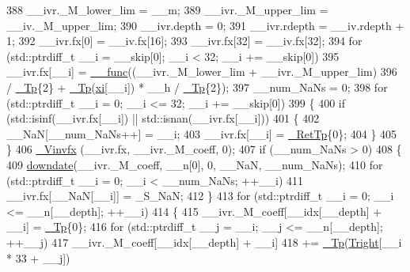 \begin{DoxyCode}
388               \_\_ivr.\_M\_lower\_lim = \_\_m;
389               \_\_ivr.\_M\_upper\_lim = \_\_iv.\_M\_upper\_lim;
390               \_\_ivr.depth = 0;
391               \_\_ivr.rdepth = \_\_iv.rdepth + 1;
392               \_\_ivr.fx[0] = \_\_iv.fx[16];
393               \_\_ivr.fx[32] = \_\_iv.fx[32];
394               \textcolor{keywordflow}{for} (std::ptrdiff\_t \_\_i = \_\_skip[0]; \_\_i < 32; \_\_i += \_\_skip[0])
395                 \_\_ivr.fx[\_\_i] = \hyperlink{namespace____gnu__cxx_af2b2f0c7a2ae72b922b1afefae5a65b2}{\_\_func}((\_\_ivr.\_M\_lower\_lim + \_\_ivr.\_M\_upper\_lim)
396                               / \hyperlink{namespace____gnu__cxx_a3b19a9c800ca194374ef9172290f7d79}{\_Tp}\{2\} + \hyperlink{namespace____gnu__cxx_a3b19a9c800ca194374ef9172290f7d79}{\_Tp}(\hyperlink{namespace____gnu__cxx_a8a912ee89c90a7e5049ce5ffad04274b}{xi}[\_\_i]) * \_\_h / \hyperlink{namespace____gnu__cxx_a3b19a9c800ca194374ef9172290f7d79}{\_Tp}\{2\});
397               \_\_num\_NaNs = 0;
398               \textcolor{keywordflow}{for} (std::ptrdiff\_t \_\_i = 0; \_\_i <= 32; \_\_i += \_\_skip[0])
399                 \{
400                   \textcolor{keywordflow}{if} (std::isinf(\_\_ivr.fx[\_\_i]) || std::isnan(\_\_ivr.fx[\_\_i]))
401                     \{
402                       \_\_NaN[\_\_num\_NaNs++] = \_\_i;
403                       \_\_ivr.fx[\_\_i] = \hyperlink{namespace____gnu__cxx_a886e03ece3d53ff7fa6c098a40f93fa5}{\_RetTp}\{0\};
404                     \}
405                 \}
406               \hyperlink{namespace____gnu__cxx_a6215f0335d2b6f478726299660ccca4e}{\_Vinvfx} (\_\_ivr.fx, \_\_ivr.\_M\_coeff, 0);
407               \textcolor{keywordflow}{if} (\_\_num\_NaNs > 0)
408                 \{
409                   \hyperlink{namespace____gnu__cxx_a3a0de8d324d776aa6b7f631559da4d7c}{downdate}(\_\_ivr.\_M\_coeff, \_\_n[0], 0, \_\_NaN, \_\_num\_NaNs);
410                   \textcolor{keywordflow}{for} (std::ptrdiff\_t \_\_i = 0; \_\_i < \_\_num\_NaNs; ++\_\_i)
411                     \_\_ivr.fx[\_\_NaN[\_\_i]] = \_S\_NaN;
412                 \}
413               \textcolor{keywordflow}{for} (std::ptrdiff\_t \_\_i = 0; \_\_i <= \_\_n[\_\_depth]; ++\_\_i)
414                 \{
415                   \_\_ivr.\_M\_coeff[\_\_idx[\_\_depth] + \_\_i] = \hyperlink{namespace____gnu__cxx_a3b19a9c800ca194374ef9172290f7d79}{\_Tp}\{0\};
416                   \textcolor{keywordflow}{for} (std::ptrdiff\_t \_\_j = \_\_i; \_\_j <= \_\_n[\_\_depth]; ++\_\_j)
417                     \_\_ivr.\_M\_coeff[\_\_idx[\_\_depth] + \_\_i]
418                         += \hyperlink{namespace____gnu__cxx_a3b19a9c800ca194374ef9172290f7d79}{\_Tp}(\hyperlink{namespace____gnu__cxx_aa35b50708b727cd96920850c90482637}{Tright}[\_\_i * 33 + \_\_j])

\end{DoxyCode}
